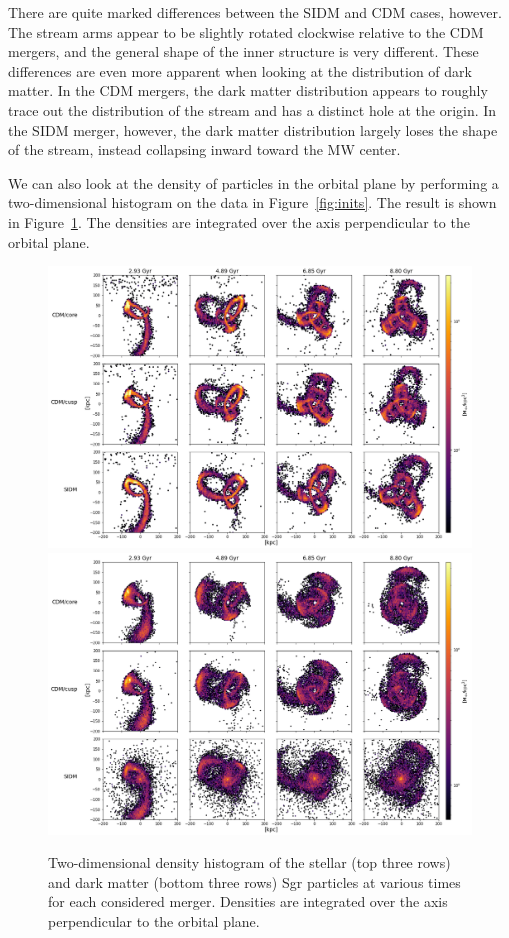 There are quite marked differences between the SIDM and CDM cases, however.
The stream arms appear to be slightly rotated clockwise relative to the CDM
mergers, and the general shape of the inner structure is very different. These
differences are even more apparent when looking at the distribution of dark
matter. In the CDM mergers, the dark matter distribution appears to roughly
trace out the distribution of the stream and has a distinct hole at the
origin.  In the SIDM merger, however, the dark matter distribution largely
loses the shape of the stream, instead collapsing inward toward the MW center.

We can also look at the density of particles in the orbital plane by performing
a two-dimensional histogram on the data in Figure~\ref{fig:inits}.  The result
is shown in Figure~\ref{fig:densities}.  The densities are integrated over the
axis perpendicular to the orbital plane.

\begin{figure}
    \centering
    \includegraphics[width=0.9\linewidth]{figs/density_stars.png}
    \includegraphics[width=0.9\linewidth]{figs/density_darks.png}
    \caption{%
        Two-dimensional density histogram of the stellar (top three rows) and
        dark matter (bottom three rows) Sgr particles at various times for
        each considered merger.  Densities are integrated over the axis
        perpendicular to the orbital plane.
    }
    \label{fig:densities}
\end{figure}

